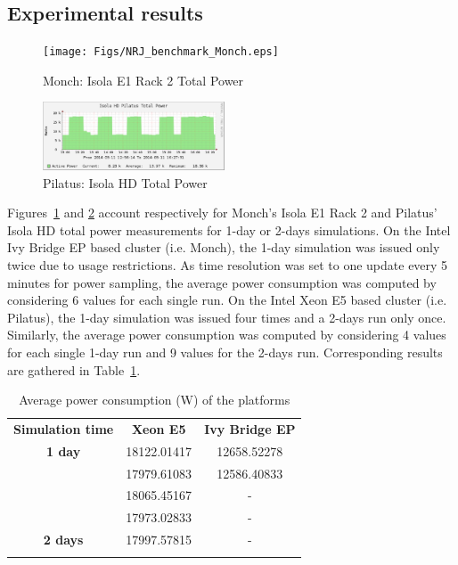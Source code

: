 \subsection{Experimental results}
\label{subsec:4.3}

\begin{figure}[htbf]
  \begin{center}
    \texttt{[image: Figs/NRJ\_benchmark\_Monch.eps]}
    \caption{Monch: Isola E1 Rack 2 Total Power}
    \label{fig:1}
  \end{center}
\end{figure}

\begin{figure}[htbf]
  \begin{center}
    \includegraphics[width=0.48\textwidth]{Figs/NRJ_benchmark_Pilatus.eps}
    \caption{Pilatus: Isola HD Total Power}
    \label{fig:2}
  \end{center}
\end{figure}

Figures~\ref{fig:1} and  \ref{fig:2} account respectively  for Monch's
Isola E1  Rack 2  and Pilatus' Isola  HD total power  measurements for
1-day or 2-days simulations. On  the Intel Ivy Bridge EP based cluster
(i.e. Monch), the 1-day simulation  was issued only twice due to usage
restrictions. As time resolution was set to one update every 5 minutes
for  power sampling,  the average  power consumption  was  computed by
considering 6 values for each single  run.  On the Intel Xeon E5 based
cluster (i.e.   Pilatus), the 1-day  simulation was issued  four times
and a 2-days  run only once. Similarly, the  average power consumption
was computed by  considering 4 values for each single  1-day run and 9
values  for the  2-days  run. Corresponding  results  are gathered  in
Table~\ref{tab:3}.

\begin{table}[htbf]
  \begin{center}
    \caption{Average power consumption (W) of the platforms}
    \label{tab:3}
    \begin{tabular}{ccc}
      \hline\noalign{\smallskip}
      \textbf{Simulation time} & \textbf{Xeon E5} & \textbf{Ivy Bridge EP} \\
      \noalign{\smallskip}\hline\noalign{\smallskip}
      \textbf{1 day} & 18122.01417 & 12658.52278 \\ 
      & 17979.61083 & 12586.40833 \\
      & 18065.45167 & - \\
      & 17973.02833 & - \\
      \noalign{\smallskip}\hline\noalign{\smallskip}
      \textbf{2 days} & 17997.57815 & - \\
      \noalign{\smallskip}\hline
    \end{tabular}
  \end{center}
\end{table}

